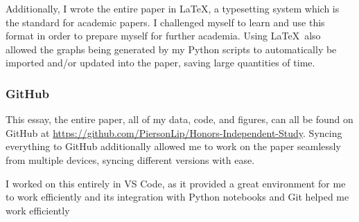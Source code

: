 \documentclass[12pt, a4paper]{article}
\begin{document}
            Additionally, I wrote the entire paper in \LaTeX, a typesetting system which is the standard for academic papers. I challenged myself to learn and use this format in order to prepare myself for further academia. Using \LaTeX ~also allowed the graphs being generated by my Python scripts to automatically be imported and/or updated into the paper, saving large quantities of time.

        \subsubsection{GitHub} \label{GitHub}
            This essay, the entire paper, all of my data, code, and figures, can all be found on GitHub at \url{https://github.com/PiersonLip/Honors-Independent-Study}. Syncing everything to GitHub additionally allowed me to work on the paper seamlessly from multiple devices, syncing different versions with ease. 

            I worked on this entirely in VS Code, as it provided a great environment for me to work efficiently and its integration with Python notebooks and Git helped me work efficiently

    
\printbibliography[
heading=bibintoc,
title={\centering Sources}
]
\end{document}
